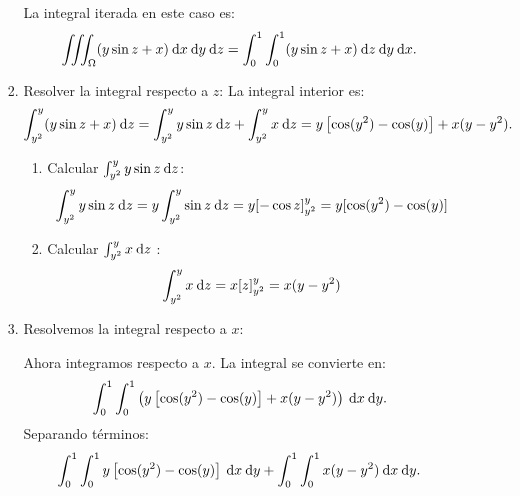 \begin{enumerate}[label=\color{red}\textbf{\arabic*)}, leftmargin=*]
\begin{enumerate}[label=\color{red}\textbf{\alph*)}]
\begin{enumerate}[label=\arabic*)]
  La integral iterada en este caso es: \[
  \iiint_\Omega(y\sin z+x)\:\mathrm{d}x \:\mathrm{d}y \:\mathrm{d}z =\int_{0}^{1} \int_{0}^{1} (y\sin z+x)\:\mathrm{d}z \:\mathrm{d}y \:\mathrm{d}x.   
  \] 
\item Resolver la integral respecto a $z$:
  La integral interior es:  \[
  \int_{y^2}^{y} (y\sin z+x)\:\mathrm{d}z=\int_{y^2}^{y} y\sin z\:\mathrm{d}z +\int_{y^2}^{y} x\:\mathrm{d}z =y\left[ \cos(y^2)-\cos(y) \right] + x(y-y^2).    
  \] 
  \begin{enumerate}[label=\alph*)]
    \item Calcular $\int_{y^2}^{y} y\sin z\:\mathrm{d}z  $: \[
        \int_{y^2}^{y} y\sin z\:\mathrm{d}z =y \int_{y^2}^{y} \sin z\:\mathrm{d}z =y[-\cos z]_{y^2}^y=y[\cos(y^2)-\cos(y)]  
    \] 
  \item Calcular $\int_{y^2}^{y} x\:\mathrm{d}z $ : \[
      \int_{y^2}^{y} x\:\mathrm{d}z =x[z]_{y^2}^y=x(y-y^2)
  \] 
  \end{enumerate} 
\item Resolvemos la integral respecto a $x$:
  
  Ahora integramos respecto a  $x$. La integral se convierte en:  \[
    \int_{0}^{1} \int_{0}^{1} \left( y\left[ \cos(y^2)-\cos(y) \right] +x(y-y^2) \right)\:\mathrm{d}x \:\mathrm{d}y  .
  \] 
  Separando términos: \[
  \int_{0}^{1} \int_{0}^{1} y\left[ \cos(y^2)-\cos(y) \right] \:\mathrm{d}x \:\mathrm{d}y +\int_{0}^{1} \int_{0}^{1} x(y-y^2)\:\mathrm{d}x \:\mathrm{d}y .    
  \] 
\end{enumerate}
\end{enumerate}
\end{enumerate}

